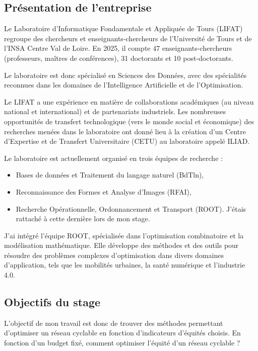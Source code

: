 \subsection{Présentation de l'entreprise}

Le Laboratoire d'Informatique Fondamentale et Appliquée de Tours (LIFAT) \cite{lifat} regroupe des chercheurs et enseignants-chercheurs de l'Université de Tours et de l'INSA Centre Val de Loire. En 2025, il compte 47 enseignants-chercheurs (professeurs, maîtres de conférences), 31 doctorants et 10 post-doctorants.

Le laboratoire est donc spécialisé en Sciences des Données, avec des spécialités reconnues dans les domaines de l'Intelligence Artificielle et de l'Optimisation.

Le LIFAT a une expérience en matière de collaborations académiques (au niveau national et international) et de partenariats industriels. Les nombreuses opportunités de transfert technologique (vers le monde social et économique) des recherches menées dans le laboratoire ont donné lieu à la création d'un Centre d'Expertise et de Transfert Universitaire (CETU) au laboratoire appelé ILIAD.

Le laboratoire est actuellement organisé en trois équipes de recherche :

\begin{itemize}
    \item Bases de données et Traitement du langage naturel (BdTln),
    \item Reconnaissance des Formes et Analyse d'Images (RFAI),
    \item Recherche Opérationnelle, Ordonnancement et Transport (ROOT). J'étais rattaché à cette dernière lors de mon stage.
\end{itemize}

J'ai intégré l'équipe ROOT, spécialisée dans l'optimisation combinatoire et la modélisation mathématique. Elle développe des méthodes et des outils pour résoudre des problèmes complexes d'optimisation dans divers domaines d'application, tels que les mobilités urbaines, la santé numérique et l'industrie 4.0.

\subsection{Objectifs du stage}

L'objectif de mon travail est donc de trouver des méthodes permettant d'optimiser un réseau cyclable en fonction d'indicateurs d'équités choisis. En fonction d'un budget fixé, comment optimiser l'équité d'un réseau cyclable ?
